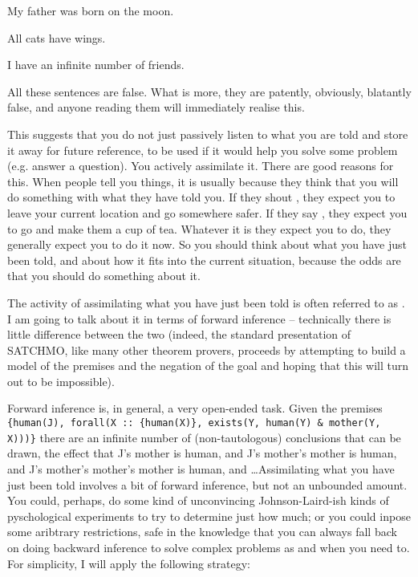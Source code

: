 \documentclass[11pt,a4paper]{article}
\begin{document}
\begin{examples}
\item \label{ABSURDS}
\begin{examples}
\item
My father was born on the moon.
\item
All cats have wings.
\item
I have an infinite number of friends.
\end{examples}
\end{examples}

\noindent
All these sentences are false. What is more, they are patently,
obviously, blatantly false, and anyone reading them will immediately
realise this.

This suggests that you do not just passively listen to what you are
told and store it away for future reference, to be used if it would
help you solve some problem (e.g. answer a question). You actively
assimilate it. There are good reasons for this. When people tell you
things, it is usually because they think that you will do something
with what they have told you. If they shout , they expect you
to leave your current location and go somewhere safer. If they say
, they expect you to go and make them a
cup of tea. Whatever it is they expect you to do, they generally
expect you to do it now. So you should think about what you have just
been told, and about how it fits into the current situation, because
the odds are that you should do something about it.

The activity of assimilating what you have just been told is often
referred to as  \citep{Bos:01}. I am going to
talk about it in terms of forward inference -- technically there is
little difference between the two (indeed, the standard presentation
of SATCHMO, like many other
theorem provers, proceeds by attempting to build a model of the
premises and the negation of the goal and hoping that this will turn
out to be impossible).

Forward inference is, in general, a very open-ended task. Given the
premises \texttt{\{human(J), forall(X :: \{human(X)\}, exists(Y,
  human(Y) \& mother(Y, X)))\}} there are an infinite number of
  (non-tautologous) conclusions that can be drawn, the effect that J's
  mother is human, and J's mother's mother is human, and J's mother's
  mother's mother is human, and \ldots Assimilating what you have just
  been told involves a bit of forward inference, but not an unbounded
  amount. You could, perhaps, do some kind of unconvincing
  Johnson-Laird-ish kinds of pyschological experiments to try to
  determine just how much; or you could inpose some aribtrary
  restrictions, safe in the knowledge that you can always fall back on
  doing backward inference to solve complex problems as and when you
  need to. For simplicity, I will apply the following strategy:
\end{document}
